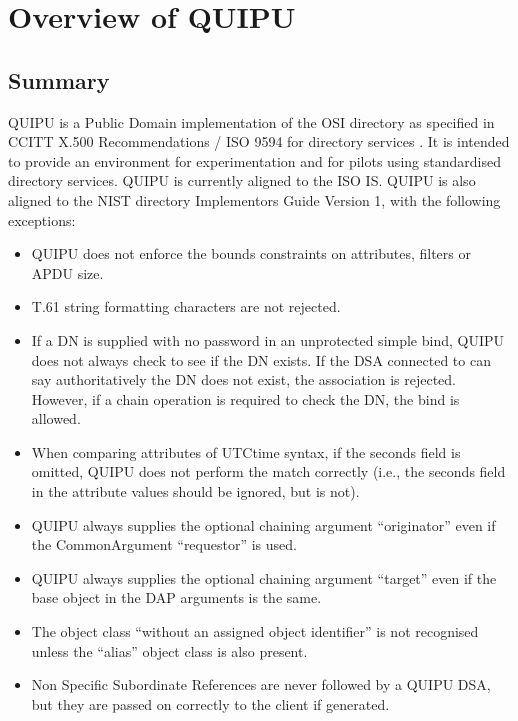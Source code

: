 
\chapter {Overview of QUIPU}

\section {Summary}

QUIPU is a Public Domain implementation of the OSI directory as 
specified in CCITT X.500 Recommendations /
ISO 9594 for directory services 
\cite{ISO.Directory,CCITT.Directory}.
It is intended to provide an environment for experimentation and for 
pilots using standardised directory services.  QUIPU is currently aligned to
the ISO IS.  
QUIPU is also aligned to the NIST directory Implementors Guide Version 1, with 
the following exceptions:
\begin{itemize}
\item
QUIPU does not enforce the bounds constraints on attributes, filters or
APDU size.
\item 
T.61 string formatting characters are not rejected.
\item 
If a DN is supplied with no password in an unprotected simple bind,
QUIPU does not always check to see if the DN exists.
If the DSA connected to can
say authoritatively the DN does not exist, the association is rejected.
However, if a chain operation is required to check the DN, the bind is allowed.
\item 
When comparing attributes of UTCtime syntax, if the seconds field is
omitted, QUIPU does not perform the match
correctly (i.e., the seconds field in the attribute values should be ignored,
but is not).
\item 
QUIPU always supplies the optional chaining argument ``originator'' even if
the CommonArgument ``requestor'' is used.
\item
QUIPU always supplies the optional chaining argument ``target'' even if
the base object in the DAP arguments is the same.
\item 
The object class ``without an assigned object identifier'' is not recognised 
unless the ``alias'' object class is also present.

\item
Non Specific Subordinate References are never followed by a QUIPU DSA,
but they are passed on correctly to the client if generated.

\end{itemize}

